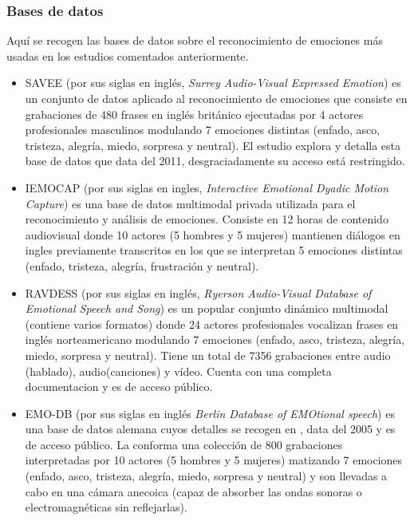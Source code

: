 \documentclass[11pt,a4paper,spanish]{book}
\begin{document}
	\subsubsection{Bases de datos}
	Aquí se recogen las bases de datos sobre el reconocimiento de emociones más usadas en los estudios comentados anteriormente.
	
	\begin{itemize}
		\item SAVEE (por sus siglas en inglés, \emph{ Surrey Audio-Visual Expressed Emotion}) es un conjunto de datos aplicado al reconocimiento de emociones que consiste en grabaciones de 480 frases en inglés británico ejecutadas por 4 actores profesionales masculinos modulando 7 emociones distintas (enfado, asco, tristeza, alegría, miedo, sorpresa y neutral). El estudio \cite{SAVEEdataset} explora y detalla esta base de datos que data del 2011, desgraciadamente su acceso está restringido.
		
		\item IEMOCAP (por sus siglas en ingles, \emph{Interactive Emotional Dyadic Motion Capture}) es una base de datos multimodal privada utilizada para el reconocimiento y análisis de emociones. Consiste en 12 horas de contenido audiovisual donde 10 actores (5 hombres y 5 mujeres) mantienen diálogos en ingles previamente transcritos en los que se interpretan 5 emociones distintas (enfado, tristeza, alegría, frustración y neutral).
		
		\item RAVDESS (por sus siglas en inglés, \emph{Ryerson Audio-Visual Database of Emotional Speech and Song}) es un popular conjunto dinámico multimodal (contiene varios formatos) donde 24 actores profesionales vocalizan frases en inglés norteamericano modulando 7 emociones (enfado, asco, tristeza, alegría, miedo, sorpresa y neutral). Tiene un total de 7356 grabaciones entre audio (hablado), audio(canciones) y vídeo. Cuenta con una completa documentacion \cite{Livingstone2018} y es de acceso público.
		
		\item EMO-DB (por sus siglas en inglés \emph{Berlin Database of EMOtional speech}) es una base de datos alemana cuyos detalles se recogen en \cite{emodb2005}, data del 2005 y es de acceso público. La conforma una colección de 800 grabaciones interpretadas por 10 actores (5 hombres y 5 mujeres) matizando 7 emociones (enfado, asco, tristeza, alegría, miedo, sorpresa y neutral) y son llevadas a cabo en una cámara anecoica (capaz de absorber las ondas sonoras o electromagnéticas sin reflejarlas).
		
	\end{itemize}
\end{document}
